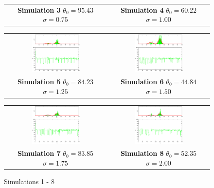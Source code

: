 \begin{figure}
\begin{tabular}{cc}
\textbf{Simulation 3} $\theta_0=   95.43$  $\sigma=    0.75$  & \textbf{Simulation 4} $\theta_0=   60.22$  $\sigma=    1.00$
\end{tabular}
\begin{tabular}{cc} 
\includegraphics[width=0.5\textwidth]{ImaginiLatex/MetropolisExample5.eps} &
\includegraphics[width=0.5\textwidth]{ImaginiLatex/MetropolisExample6.eps} \\
\textbf{Simulation 5} $\theta_0=   84.23$  $\sigma=    1.25$  & \textbf{Simulation 6} $\theta_0=   44.84$  $\sigma=    1.50$
\end{tabular}
\begin{tabular}{cc} 
\includegraphics[width=0.5\textwidth]{ImaginiLatex/MetropolisExample7.eps} &
\includegraphics[width=0.5\textwidth]{ImaginiLatex/MetropolisExample8.eps} \\
\textbf{Simulation 7} $\theta_0=   83.85$  $\sigma=    1.75$  & \textbf{Simulation 8} $\theta_0=   52.35$  $\sigma=    2.00$
\end{tabular}
\caption{Simulations 1 - 8}
\end{figure}
